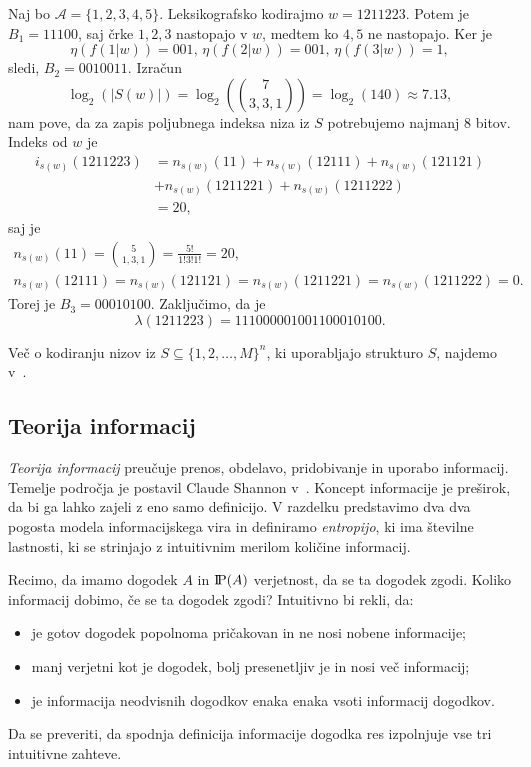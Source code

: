 \documentclass[fin1, tisk]{fmfdelo}
\providecommand{\abs}[1]{\left\lvert #1 \right\rvert}
\newcommand{\probP}{\text{I\kern-0.15em P}}
\newcommand{\A}{\mathcal{A}}
\theoremstyle{definition}
\begin{document}
\begin{primer}\label{primer:leksikografsko}
    Naj bo $\A = \{ 1, 2, 3, 4, 5 \}$. Leksikografsko kodirajmo $w = 1211223$. Potem je
    $B_1 = 11100$, saj črke $1,2,3$ nastopajo v $w$, medtem ko $4,5$ ne nastopajo. Ker je
    \[
        \eta \left( f(1|w) \right) = 001, \, \eta \left( f(2|w) \right) = 001, \,
        \eta \left( f(3|w) \right) = 1,
    \]
    sledi, $B_2 = 0010011$. Izračun
    \[
        \log_2(\abs{S(w)}) = \log_2 \left( \binom{7}{3,3,1} \right) = \log_2(140) \approx 7.13,
    \]
    nam pove, da za zapis poljubnega indeksa niza iz $S$ potrebujemo najmanj $8$ bitov. 
    Indeks od $w$ je
    \begin{align*}
        i_{s(w)}(1211223) &= n_{s(w)}(11) + n_{s(w)}(12111) + n_{s(w)}(121121) \\
        &+ n_{s(w)}(1211221) + n_{s(w)}(1211222) \\
        &= 20,
    \end{align*}
    saj je
    \begin{gather*}
        n_{s(w)}(11) = \binom{5}{1,3,1} = \frac{5!}{1!3!1!} = 20, \\
        n_{s(w)}(12111) = n_{s(w)}(121121) = n_{s(w)}(1211221) = n_{s(w)}(1211222) = 0.
    \end{gather*}
    Torej je $B_3 = 00010100$. Zaključimo, da je
    \[
        \lambda(1211223) = 111000 0010011 00010100.
    \]
\end{primer}

Več o kodiranju nizov iz $S \subseteq \{ 1,2, \ldots, M\}^n$, ki uporabljajo strukturo $S$, 
najdemo v~\cite{Cover1973}.

\subsection{Teorija informacij}

\emph{Teorija informacij} preučuje prenos, obdelavo, pridobivanje in uporabo informacij. Temelje
področja je postavil Claude Shannon v~\cite{Shannon1949}. Koncept informacije je preširok, da bi 
ga lahko zajeli z eno samo definicijo. V razdelku predstavimo dva dva pogosta modela
informacijskega vira in definiramo \emph{entropijo}, ki ima številne lastnosti, ki se strinjajo z
intuitivnim merilom količine informacij.

Recimo, da imamo dogodek $A$ in $\probP(A)$ verjetnost, da se ta dogodek zgodi.
Koliko informacij dobimo, če se ta dogodek zgodi? Intuitivno bi rekli, da:
\begin{itemize}
    \item je gotov dogodek popolnoma pričakovan in ne nosi nobene informacije;
    \item manj verjetni kot je dogodek, bolj presenetljiv je in nosi več informacij;
    \item je informacija neodvisnih dogodkov enaka enaka vsoti informacij dogodkov.
\end{itemize}
Da se preveriti, da spodnja definicija informacije dogodka res izpolnjuje vse tri intuitivne zahteve.
\end{document}
